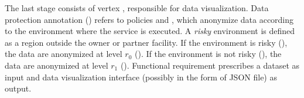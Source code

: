 \begin{example}[\bf \pipelineTemplate]
The last stage consists of vertex , responsible for data visualization.
Data protection annotation \myLambda() refers to policies  and , which anonymize data according to the environment where the service is executed.
A \emph{risky} environment is defined as a region outside the owner or partner facility.
If the environment is risky (), the data are anonymized at level $r_0$ ().
If the environment is not risky (), the data are anonymized at level $r_1$ ().
Functional requirement  prescribes a dataset as input and data visualization interface (possibly in the form of JSON file) as output.

\end{example}